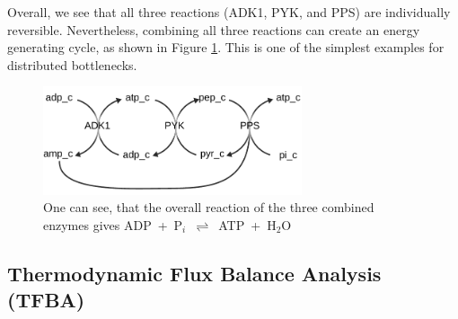 \documentclass[twocolumn]{bmcart}%
\begin{document}
Overall, we see that all three reactions (ADK1, PYK, and PPS) are individually reversible. Nevertheless, combining all three reactions can create an energy generating cycle, as shown in Figure \ref{fig:distributed_egc}. This is one of the simplest examples for distributed bottlenecks.

\begin{figure}[h!]
	\includegraphics[width=3in]{figure3.pdf}
	\caption{
		One can see, that the overall reaction of the three combined enzymes gives ADP~+~P$_i$~$\rightleftharpoons$~ATP~+~H$_2$O}
	\label{fig:distributed_egc}
\end{figure}

\subsection*{Thermodynamic Flux Balance Analysis (TFBA)}
\end{document}

